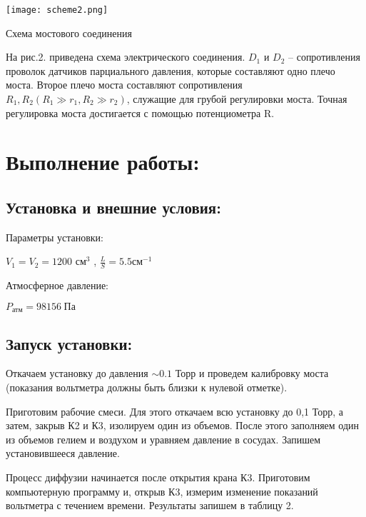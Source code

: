 \documentclass[a4paper,12pt]{article}
\theoremstyle{plain} %
\theoremstyle{definition} %
\theoremstyle{remark} %
\begin{document}
    \begin{center}
	    \texttt{[image: scheme2.png]}
	    
        Схема мостового соединения
    \end{center}
    
    На рис.2. приведена схема электрического соединения. $D_1$ и $D_2$ -- сопротивления проволок датчиков парциального давления, которые составляют одно плечо моста.  Второе плечо моста составляют сопротивления $R_1, R_2 (R_1 \gg r_1, R_2 \gg r_2)$, служащие для грубой регулировки моста. Точная регулировка моста достигается с помощью потенциометра R.
    
\newpage
\section{Выполнение работы:}
    \subsection{Установка и внешние условия:}
    
        Параметры установки:
        \begin{center}
            $V_1  = V_2 = 1200 $ см$^3$ , $\frac{L}{S} = 5.5$см$^{-1}$    
        \end{center}
        Атмосферное давление:
        \begin{center}
            $P_\textit{атм} =  98156 \hspace{3pt} \textsf{Па} $    
        \end{center}
    
    \subsection{Запуск установки:}
    
        Откачаем установку до давления $\sim 0.1 \textsf{ Торр}$ и проведем калибровку моста (показания вольтметра должны быть близки к нулевой отметке). 
    
        Приготовим рабочие смеси. Для этого откачаем всю установку до 0,1 Торр, а затем, закрыв К2 и К3, изолируем один из объемов. После этого заполняем один из объемов гелием и воздухом и уравняем давление в сосудах. Запишем установившееся давление.
    
        Процесс диффузии начинается после открытия крана К3. Приготовим компьютерную программу и, открыв К3, измерим изменение показаний вольтметра с течением времени. Результаты запишем в таблицу 2.
\end{document}
